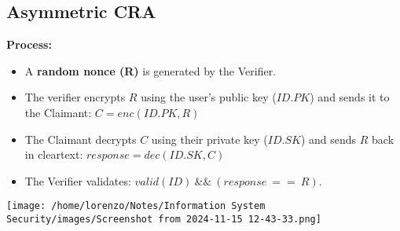 \subsection{Asymmetric CRA}
\begin{minipage}{0.6\textwidth}
    \textbf{Process:}
    \begin{itemize}
        \item A \textbf{random nonce (R)} is generated by the Verifier.
        \item The verifier encrypts \(R\) using the user's public key (\(ID.PK\)) and sends it to the Claimant:
        \(C=enc(ID.PK,R)\)
        \item The Claimant decrypts \(C\) using their private key (\(ID.SK\)) and sends \(R\) back in cleartext:
        \(response=dec(ID.SK,C)\)
        \item The Verifier validates: \(valid(ID)\ \&\&\ (response\ ==\ R)\).
    \end{itemize}
\end{minipage} 
\hspace{0.2cm}
\begin{minipage}{0.4\textwidth}
    \centering
    \texttt{[image: /home/lorenzo/Notes/Information System Security/images/Screenshot from 2024-11-15 12-43-33.png]}
\end{minipage}
